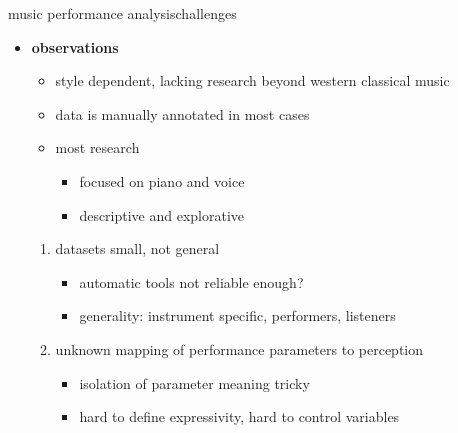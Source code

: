         \begin{frame}{music performance analysis}{challenges}
            \begin{itemize}
                \item   \textbf{observations}
                    \begin{itemize}
                        \item   style dependent, lacking research beyond western classical music
                        \item   data is manually annotated in most cases
                        \item   most research 
                            \begin{itemize}
                                \item   focused on piano and voice 
                                \item   descriptive and explorative
                            \end{itemize}
                    \end{itemize}
                    \bigskip
                    \begin{enumerate}
                        \item   datasets small, not general
                            \begin{itemize}
                                \item automatic tools not reliable enough?
                                \item   generality: instrument specific, performers, listeners
                            \end{itemize}
                        \item   unknown mapping of performance parameters to perception
                            \begin{itemize}
                                \item   isolation of parameter meaning tricky
                                \item   hard to define expressivity, hard to control variables
                            \end{itemize}
                    \end{enumerate}
            \end{itemize}

        \end{frame}
    
